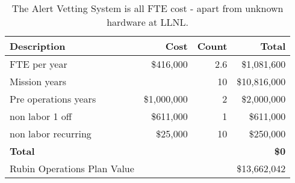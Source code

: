 \tiny \begin{longtable} {|l|r|r|r|} \caption{The Alert Vetting System is all FTE cost - apart from unknown hardware at LLNL. \label{tab:eliminate}}\\ 
\hline 
\textbf{Description}&\textbf{Cost}&\textbf{Count}&\textbf{Total} \\ \hline
{FTE per year}&{\$416,000}&{2.6}&{\$1,081,600} \\ \hline
{Mission years}&{}&{10}&{\$10,816,000} \\ \hline
{Pre operations years}&{\$1,000,000}&{2}&{\$2,000,000} \\ \hline
{non labor 1 off}&{\$611,000}&{1}&{\$611,000} \\ \hline
{non labor recurring}&{\$25,000}&{10}&{\$250,000} \\ \hline
\textbf{Total }&\textbf{}&\textbf{}&\textbf{\$0} \\ \hline
{Rubin Operations Plan Value}&{}&{}&{\$13,662,042} \\ \hline
\end{longtable} \normalsize
